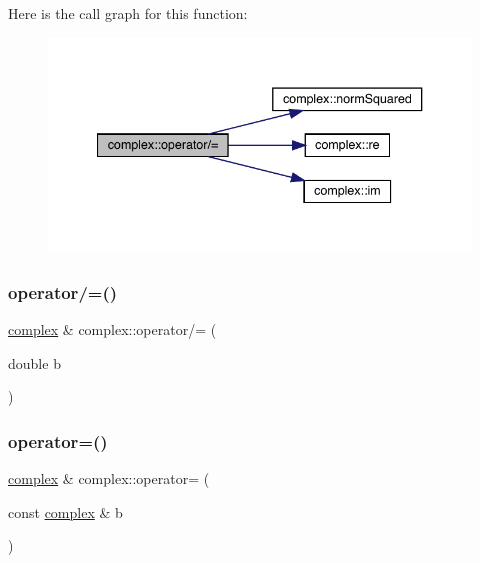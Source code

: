 Here is the call graph for this function\+:\nopagebreak
\begin{figure}[H]
\begin{center}
\leavevmode
\includegraphics[width=340pt]{classcomplex_a2f33210a2ac9f91ad3f1f94958c52ee9_cgraph}
\end{center}
\end{figure}
\mbox{\label{classcomplex_ae519ff68a81b3c9944a3e3ec60bbe80f}} 
\subsubsection{\texorpdfstring{operator/=()}{operator/=()}\hspace{0.1cm}{\footnotesize\ttfamily [2/2]}}
{\footnotesize\ttfamily \mbox{\hyperlink{classcomplex}{complex}} \& complex\+::operator/= (\begin{DoxyParamCaption}\item[{double}]{b }\end{DoxyParamCaption})}

\mbox{\label{classcomplex_a83c122535af669e7f331d71de550e9ba}} 
\subsubsection{\texorpdfstring{operator=()}{operator=()}}
{\footnotesize\ttfamily \mbox{\hyperlink{classcomplex}{complex}} \& complex\+::operator= (\begin{DoxyParamCaption}\item[{const \mbox{\hyperlink{classcomplex}{complex}} \&}]{b }\end{DoxyParamCaption})}

